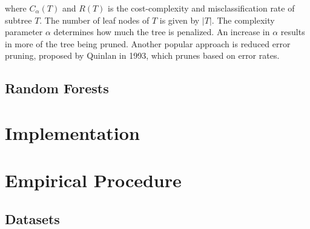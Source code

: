 \documentclass[conference]{IEEEtran}
\begin{document}
        where $C_\alpha(T)$ and $R(T)$ is the cost-complexity and misclassification rate of subtree $T$. The number of leaf nodes
        of $T$ is given by $|T|$. The complexity parameter $\alpha$ determines how much the tree is penalized. An increase in
        $\alpha$ results in more of the tree being pruned. Another popular approach is reduced error pruning, proposed by 
        Quinlan \cite{DT_quinlan1993} in 1993, which prunes based on error rates.

    \subsection{Random Forests}



\section{Implementation}

    

\section{Empirical Procedure}


    \subsection{Datasets}
\end{document}
